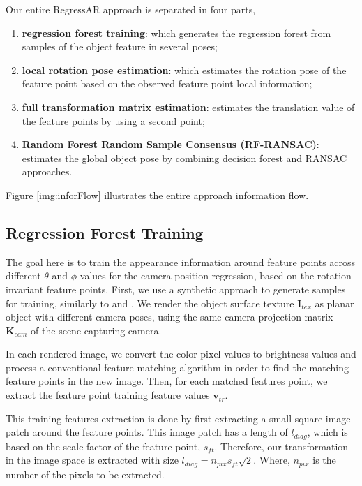\documentclass[annual]{acmsiggraph}
\begin{document}
Our entire RegressAR approach is separated in four parts, 
\begin{enumerate}
  \item \textbf{regression forest training}: which generates the regression forest from samples of the object feature in several poses;
  \item \textbf{local rotation pose estimation}: which estimates the rotation pose of the feature point based on the observed feature point local information;
  \item \textbf{full transformation matrix estimation}: estimates the translation value of the feature points by using a second point; 
  \item \textbf{Random Forest Random Sample Consensus (RF-RANSAC)}: estimates the global object pose by combining decision forest and RANSAC approaches.
\end{enumerate}
Figure \ref{img:inforFlow} illustrates the entire approach information flow.

\subsection{Regression Forest Training}
\label{subsec:poseMethod:rfTrain}


The goal here is to train the appearance information around feature points across different $\theta$ and $\phi$ values for the camera position regression, based on the rotation invariant feature points. First, we use a synthetic approach to generate samples for training, similarly to \cite{Morel:2009} and \cite{Criminisi:Book}. We render the object surface texture $\mathbf{I}_{tex}$ as planar object with different camera poses, using the same camera projection matrix $\mathbf{K}_{cam}$ of the scene capturing camera. 

In each rendered image, we convert the color pixel values to brightness values and process a conventional feature matching algorithm \cite{Bay:2008} in order to find the matching feature points in the new image. Then, for each matched features point, we extract the feature point training feature values $\mathbf{v}_{tr}$.   

This training features extraction is done by first extracting a small square image patch around the feature points. This image patch has a length of $l_{diag}$, which is based on the scale factor of the feature point, $s_{ft}$. Therefore, our transformation in the image space is extracted with size $l_{diag} = n_{pix}s_{ft}\sqrt{2}$. Where, $n_{pix}$ is the number of the pixels to be extracted.
\end{document}
